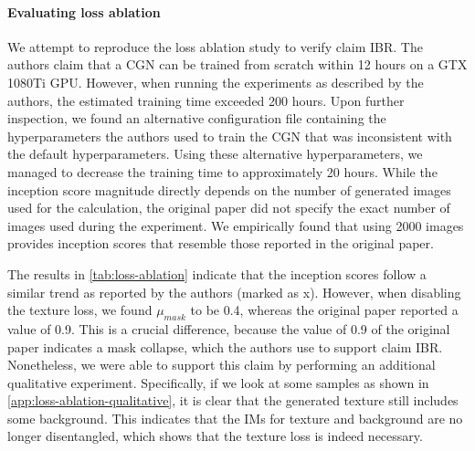 \paragraph{Evaluating loss ablation} We attempt to reproduce the loss ablation study to verify claim IBR. The authors claim that a CGN can be trained from scratch within 12 hours on a GTX 1080Ti GPU. However, when running the experiments as described by the authors, the estimated training time exceeded 200 hours. Upon further inspection, we found an alternative configuration file containing the hyperparameters the authors used to train the CGN that was inconsistent with the default hyperparameters. Using these alternative hyperparameters, we managed to decrease the training time to approximately 20 hours.
While the inception score magnitude directly depends on the number of generated images used for the calculation, the original paper did not specify the exact number of images used during the experiment. We empirically found that using 2000 images provides inception scores that resemble those reported in the original paper.

The results in \cref{tab:loss-ablation} indicate that the inception scores follow a similar trend as reported by the authors (marked as \colorbox{blue!10}{x}). However, when disabling the texture loss, we found $\mu_{mask}$ to be 0.4, whereas the original paper reported a value of 0.9. This is a crucial difference, because the value of 0.9 of the original paper indicates a mask collapse, which the authors use to support claim IBR. Nonetheless, we were able to support this claim by performing an additional qualitative experiment. Specifically, if we look at some samples as shown in \cref{app:loss-ablation-qualitative}, it is clear that the generated texture still includes some background. 
This indicates that the IMs for texture and background are no longer disentangled, which shows that the texture loss is indeed necessary.



